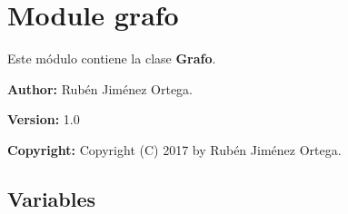 %
%
%


\section{Module grafo}

    \label{grafo}
Este módulo contiene la clase \textbf{Grafo}.

\textbf{Author:} Rubén Jiménez Ortega.



\textbf{Version:} 1.0



\textbf{Copyright:} Copyright (C) 2017 by Rubén Jiménez Ortega.





  \subsection{Variables}

